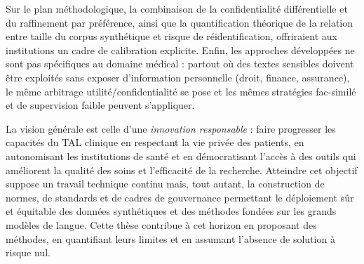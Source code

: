 Sur le plan méthodologique, la combinaison de la confidentialité différentielle et du
raffinement par préférence, ainsi que la quantification théorique de la relation entre taille
du corpus synthétique et risque de réidentification, offriraient aux institutions un cadre de
calibration explicite. Enfin, les approches développées ne sont pas spécifiques au domaine
médical : partout où des textes sensibles doivent être exploités sans exposer d'information
personnelle (droit, finance, assurance), le même arbitrage utilité/confidentialité se pose et
les mêmes stratégies fac-similé et de supervision faible peuvent s'appliquer.

La vision générale est celle d'une \textit{innovation responsable} : faire progresser les
capacités du TAL clinique en respectant la vie privée des patients, en autonomisant les
institutions de santé et en démocratisant l'accès à des outils qui améliorent la qualité des
soins et l'efficacité de la recherche. Atteindre cet objectif suppose un travail technique
continu mais, tout autant, la construction de normes, de standards et de cadres de
gouvernance permettant le déploiement sûr et équitable des données synthétiques et des
méthodes fondées sur les grands modèles de langue. Cette thèse contribue à cet horizon
en proposant des méthodes, en quantifiant leurs limites et en assumant l'absence de
solution à risque nul.
